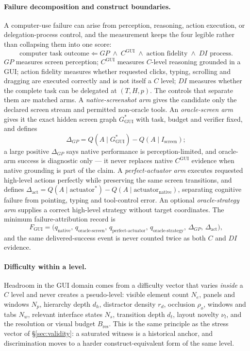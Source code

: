 \paragraph{Failure decomposition and construct boundaries.} A computer-use failure can arise from perception, reasoning, action execution, or delegation-process control, and the measurement keeps the four legible rather than collapsing them into one score:
\[
\text{computer task outcome} \Leftarrow GP \;\wedge\; C^{\mathrm{GUI}} \;\wedge\; \text{action fidelity} \;\wedge\; DI \text{ process}.
\]
$GP$ measures screen perception; $C^{\mathrm{GUI}}$ measures $C$-level reasoning grounded in a GUI; action fidelity measures whether requested clicks, typing, scrolling and dragging are executed correctly and is not itself a $C$ level; $DI$ measures whether the complete task can be delegated at $(T, H, p)$. The controls that separate them are matched arms. A \emph{native-screenshot arm} gives the candidate only the declared screen stream and permitted non-oracle tools. An \emph{oracle-screen arm} gives it the exact hidden screen graph $G^{*}_{\mathrm{GUI}}$ with task, budget and verifier fixed, and defines
\[
\Delta_{GP} = Q(A \mid G^{*}_{\mathrm{GUI}}) - Q(A \mid I_{\mathrm{screen}});
\]
a large positive $\Delta_{GP}$ says native performance is perception-limited, and oracle-arm success is diagnostic only --- it never replaces native $C^{\mathrm{GUI}}$ evidence when native grounding is part of the claim. A \emph{perfect-actuator arm} executes requested high-level actions perfectly while preserving the same screen transitions, and defines $\Delta_{\mathrm{act}} = Q(A \mid \text{actuator}^{*}) - Q(A \mid \text{actuator}_{\mathrm{native}})$, separating cognitive failure from pointing, typing and tool-control error. An optional \emph{oracle-strategy arm} supplies a correct high-level strategy without target coordinates. The minimum failure-attribution record is
\[
F_{\mathrm{GUI}} = \big(q_{\mathrm{native}},\, q_{\mathrm{oracle\text{-}screen}},\, q_{\mathrm{perfect\text{-}actuator}},\, q_{\mathrm{oracle\text{-}strategy}},\, \Delta_{GP},\, \Delta_{\mathrm{act}}\big),
\]
and the same delivered-success event is never counted twice as both $C$ and $DI$ evidence.

\paragraph{Difficulty within a level.} Headroom in the GUI domain comes from a difficulty vector that varies \emph{inside} a $C$ level and never creates a pseudo-level: visible element count $N_e$, panels and windows $N_p$, hierarchy depth $d_h$, distractor density $r_d$, occlusion $\rho_o$, windows and tabs $N_w$, relevant interface states $N_s$, transition depth $d_t$, layout novelty $\nu_l$, and the resolution or visual budget $B_{\mathrm{res}}$. This is the same principle as the stress vector of \S\ref{sec:validity}: a saturated witness is a historical anchor, and discrimination moves to a harder construct-equivalent form of the same level.

